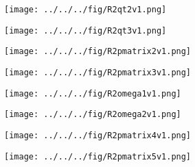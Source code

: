 \documentclass[class=article, crop=false, dvipdfmx, fleqn]{standalone}
\begin{document}
\begin{figure}[H]
 \begin{minipage}{0.5\hsize}
  \begin{center}
   \texttt{[image: ../../../fig/R2qt2v1.png]}
  \end{center}
 \end{minipage}
 \begin{minipage}{0.5\hsize}
  \begin{center}
   \texttt{[image: ../../../fig/R2qt3v1.png]}
  \end{center}
 \end{minipage}
\end{figure}

\vspace{-1cm}

\begin{figure}[H]
 \begin{minipage}{0.5\hsize}
  \begin{center}
   \texttt{[image: ../../../fig/R2pmatrix2v1.png]}
  \end{center}
 \end{minipage}
 \begin{minipage}{0.5\hsize}
  \begin{center}
   \texttt{[image: ../../../fig/R2pmatrix3v1.png]}
  \end{center}
 \end{minipage}
\end{figure}

\vspace{2cm}

\begin{figure}[H]
 \begin{minipage}{0.5\hsize}
  \begin{center}
   \texttt{[image: ../../../fig/R2omega1v1.png]}
  \end{center}
 \end{minipage}
 \begin{minipage}{0.5\hsize}
  \begin{center}
   \texttt{[image: ../../../fig/R2omega2v1.png]}
  \end{center}
 \end{minipage}
\end{figure}

\vspace{-1cm}

\begin{figure}[H]
 \begin{minipage}{0.5\hsize}
  \begin{center}
   \texttt{[image: ../../../fig/R2pmatrix4v1.png]}
  \end{center}
 \end{minipage}
 \begin{minipage}{0.5\hsize}
  \begin{center}
   \texttt{[image: ../../../fig/R2pmatrix5v1.png]}
  \end{center}
 \end{minipage}
\end{figure}
\end{document}

